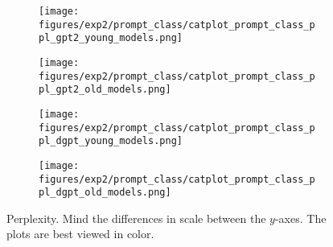 \begin{figure}[H]
     \centering
     \begin{subfigure}[b]{0.48\textwidth}
        \centering
        \texttt{[image: figures/exp2/prompt\_class/catplot\_prompt\_class\_ppl\_gpt2\_young\_models.png]}
        \caption{}
        \label{subfig:catplot_prompt_class_ppl_gpt2_young}
     \end{subfigure}
     \quad
     \begin{subfigure}[b]{0.48\textwidth}
        \centering
        \texttt{[image: figures/exp2/prompt\_class/catplot\_prompt\_class\_ppl\_gpt2\_old\_models.png]}
        \caption{}
        \label{subfig:catplot_prompt_class_ppl_gpt2_old}
     \end{subfigure}
    \medskip
    \begin{subfigure}[b]{0.48\textwidth}
        \centering
        \texttt{[image: figures/exp2/prompt\_class/catplot\_prompt\_class\_ppl\_dgpt\_young\_models.png]}
        \caption{}
        \label{subfig:catplot_prompt_class_ppl_dgpt_young}
     \end{subfigure}
    \quad
     \begin{subfigure}[b]{0.48\textwidth}
        \centering
        \texttt{[image: figures/exp2/prompt\_class/catplot\_prompt\_class\_ppl\_dgpt\_old\_models.png]}
        \caption{}
        \label{subfig:catplot_prompt_class_ppl_dgpt_old}
     \end{subfigure}
    \caption{Perplexity. Mind the differences in scale between the $y$-axes. The plots are best viewed in color. }
    \label{fig:catplot_prompt_class_ppl}
\end{figure}





